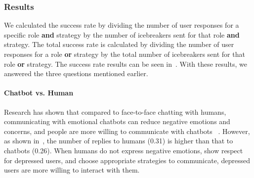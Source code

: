 
\subsubsection{Results}
\label{result_interaction}
 We calculated the success rate by dividing the number of user responses for a specific role \textbf{and} strategy by the number of icebreakers sent for that role \textbf{and} strategy. The total success rate is calculated by dividing the number of user responses for a role \textbf{or} strategy by the total number of icebreakers sent for that role \textbf{or} strategy. The success rate results can be seen in~. With these results, we answered the three questions mentioned earlier.

\paragraph{Chatbot vs. Human}
Research has shown that compared to face-to-face chatting with humans, communicating with emotional chatbots can reduce negative emotions and concerns, and people are more willing to communicate with chatbots ~\cite{drouin2022chatting}.
However, as shown in~, the number of replies to humans (0.31) is higher than that to chatbots (0.26). When humans do not express negative emotions, show respect for depressed users, and choose appropriate strategies to communicate, depressed users are more willing to interact with them.

